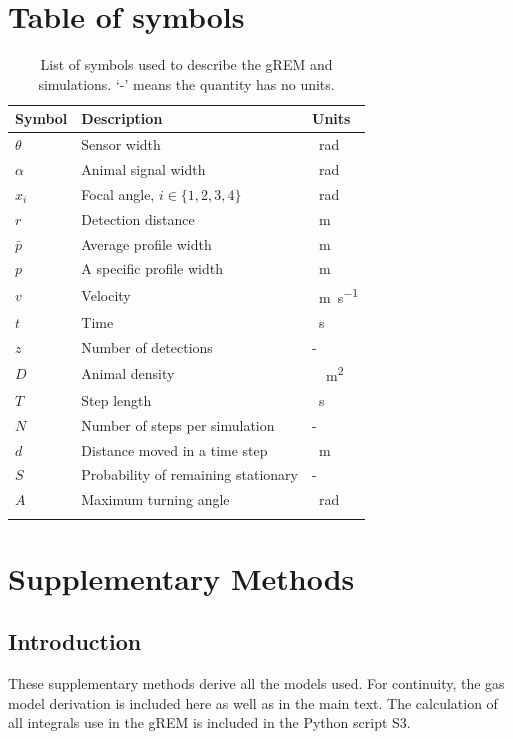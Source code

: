   

\clearpage
\section{Table of symbols}

\begin{table}[h!]
\centering
\begin{tabular}{lll}
Symbol 	& Description & Units\\\hline
$\theta$	& Sensor width & \SI{}{\radian} \\
$\alpha$	& Animal signal width & \SI{}{\radian} \\
$x_i$	        & Focal angle, $i \in \{1,2,3,4\} $ 	& \SI{}{\radian}\\
$r$ 		& Detection distance & \SI{}{\meter}\\
$\bar{p}$ 		& Average profile width & \SI{}{\meter}\\
$p$ 		& A specific profile width & \SI{}{\meter}\\
$v$		& Velocity & \SI{}{\meter\per\second}\\
$t$		& Time & \SI{}{\second}\\
$z$		& Number of detections & -\\
$D$		& Animal density & \SI{}{\per\meter\squared} \\
$T$ 		& Step length & \SI{}{\second}\\
$N$ 		& Number of steps per simulation & -\\
$d$ 		& Distance moved in a time step & \SI{}{\meter}\\
$S$ 		& Probability of remaining stationary & -\\
$A$ 		& Maximum turning angle & \SI{}{\radian}\\
\\
\end{tabular}
\caption{List of symbols used to describe the gREM and simulations. `-' means the quantity has no units.}
\label{t:paras}
\end{table}

\clearpage

\section{Supplementary Methods}
\subsection{Introduction}
These supplementary methods derive all the models used. 
For continuity, the gas model derivation is included here as well as in the main text. 
The calculation of all integrals use in the gREM is included in the Python script S3. 




